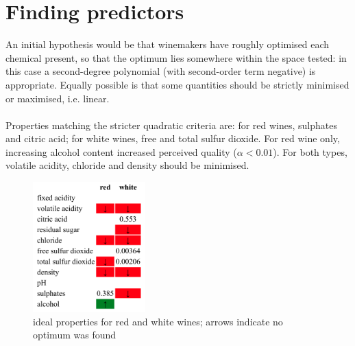 \documentclass{article}
\begin{document}
\section*{Finding predictors}
An initial hypothesis would be that winemakers have roughly optimised each chemical present, so that the optimum lies somewhere within the space 
tested: in this case a second-degree polynomial (with second-order term negative) is appropriate.  Equally possible is that some quantities should
be strictly minimised or maximised, i.e. linear.
\\~\\
Properties matching the stricter quadratic criteria are: for red wines, sulphates and citric acid; 
for white wines, free and total sulfur dioxide.  For red wine only, increasing alcohol content increased perceived quality ($\alpha < 0.01$).  
For both types, volatile acidity, chloride and density should be minimised.

\begin{figure}[h]
\centering
\includegraphics[height=5.0cm]{figures/recipe.png}
\caption{ideal properties for red and white wines; arrows indicate no optimum was found}
\label{fig:recipe}
\end{figure}
\end{document}
